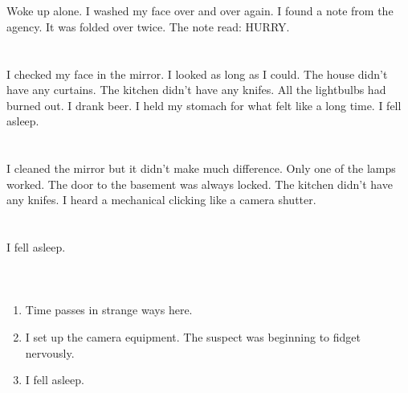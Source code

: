 \documentclass{article}
\begin{document}
    \section{}
    Woke up alone. I washed my face over and over again. I found a note from the agency. It was folded over twice. The note read: HURRY.  
    \newpage
    
    \section{}
    I checked my face in the mirror. I looked as long as I could. The house didn't have any curtains. The kitchen didn't have any knifes. All the lightbulbs had burned out. I drank beer. I held my stomach for what felt like a long time. I fell asleep.  
    \newpage
    
    \section{}
    I cleaned the mirror but it didn't make much difference. Only one of the lamps worked. The door to the basement was always locked. The kitchen didn't have any knifes. I heard a mechanical clicking like a camera shutter.  
    \newpage
    
    \section{}
    I fell asleep.\\\\ 
    \newpage
    
    \section{}
    
    \begin{enumerate}
    
    \item Time passes in strange ways here.\\
    
    \item I set up the camera equipment. The suspect was beginning to fidget nervously.\\
    
    \item I fell asleep.\\
    
    \end{enumerate}
     
\end{document}
